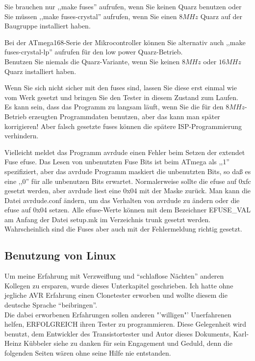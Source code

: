 Sie brauchen nur ,,make fuses'' aufrufen, wenn Sie keinen Quarz benutzen oder Sie
müssen ,,make fuses-crystal'' aufrufen, wenn Sie einen \(8MHz\) Quarz auf der Baugruppe installiert haben.

Bei der ATmega168-Serie der Mikrocontroller können Sie alternativ auch
,,make fuses-crystal-lp'' aufrufen für den low power Quarz-Betrieb.\\
Benutzen Sie niemals die Quarz-Variante, wenn Sie keinen \(8MHz\) oder \(16MHz\) Quarz installiert haben.

Wenn Sie sich nicht sicher mit den fuses sind, lassen Sie diese erst einmal wie
vom Werk gesetzt und bringen Sie den Tester in diesem Zustand zum Laufen.\\
Es kann sein, dass das Programm zu langsam läuft, wenn Sie die für den \(8MHz\)-Betrieb 
erzeugten Programmdaten benutzen, aber das kann man später korrigieren!
Aber falsch gesetzte fuses können die spätere ISP-Programmierung verhindern.

Vielleicht meldet das Programm avrdude einen Fehler beim Setzen der extendet Fuse efuse.
Das Lesen von unbenutzten Fuse Bits ist beim ATmega als ,,1'' spezifiziert, aber
das avrdude Programm maskiert die unbenutzten Bits, so daß es eine ,,0'' für alle unbenutzen Bits erwartet.
Normalerweise sollte die efuse auf 0xfc gesetzt werden, aber avrdude liest eine 0x04 mit der Maske zurück.
Man kann die Datei avrdude.conf ändern, um das Verhalten von avrdude zu ändern oder
die efuse auf 0x04 setzen. 
Alle efuse-Werte können mit dem Bezeichner EFUSE\_VAL am Anfang der Datei setup.mk im Verzeichnis trunk
gesetzt werden. Wahrscheinlich sind die Fuses aber auch mit der Fehlermeldung richtig gesetzt.

\newpage
\subsection{Benutzung von Linux}

Um meine Erfahrung mit Verzweiflung und "`schlaflose Nächten"' anderen Kollegen zu ersparen,
wurde dieses Unterkapitel geschrieben.
Ich hatte ohne jegliche AVR Erfahrung einen Clonetester erworben und wollte diesem die deutsche Sprache
"`beibringen"'.\\

Die dabei erworbenen Erfahrungen sollen anderen "'willigen"' Unerfahrenen helfen,
ERFOLGREICH ihren Tester zu programmieren.
Diese Gelegenheit wird benutzt, dem Entwickler des Transistortester und Autor dieses Dokuments,  
Karl-Heinz Kübbeler siehe \cite{karlheinz1} zu danken für sein Engagement und Geduld,
denn die folgenden Seiten wären ohne seine Hilfe nie entstanden.
     
